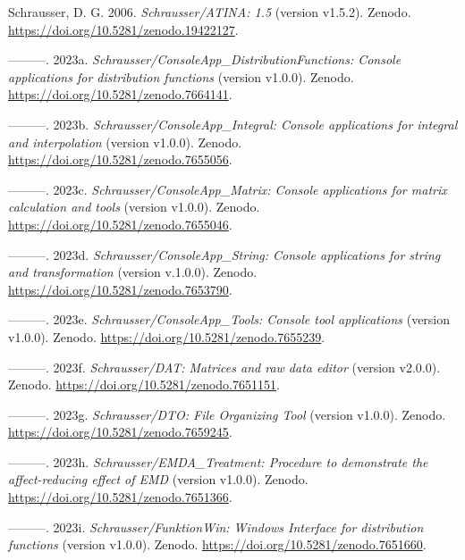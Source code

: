 \documentclass[
]{article}
\author{Dietmar Gerald SCHRAUSSER}
\date{14.04.2026}
\newlength{\cslhangindent}
\newlength{\cslentryspacingunit} %
\newenvironment{CSLReferences}[2] %
 {%
  \setlength{\parindent}{0pt}
  \ifodd #1
  \let\oldpar\par
  \def\par{\hangindent=\cslhangindent\oldpar}
  \fi
  \setlength{\parskip}{#2\cslentryspacingunit}
 }%
 {}
\begin{document}
\hypertarget{refs}{}
\begin{CSLReferences}{1}{0}
\leavevmode{}%
Schrausser, D. G. 2006. \emph{Schrausser/ATINA: 1.5} (version v1.5.2).
Zenodo. \url{https://doi.org/10.5281/zenodo.19422127}.

\leavevmode{}%
---------. 2023a. \emph{{Schrausser/ConsoleApp\_DistributionFunctions:
Console applications for distribution functions}} (version v1.0.0).
Zenodo. \url{https://doi.org/10.5281/zenodo.7664141}.

\leavevmode{}%
---------. 2023b. \emph{{Schrausser/ConsoleApp\_Integral: Console
applications for integral and interpolation}} (version v1.0.0). Zenodo.
\url{https://doi.org/10.5281/zenodo.7655056}.

\leavevmode{}%
---------. 2023c. \emph{{Schrausser/ConsoleApp\_Matrix: Console
applications for matrix calculation and tools}} (version v1.0.0).
Zenodo. \url{https://doi.org/10.5281/zenodo.7655046}.

\leavevmode{}%
---------. 2023d. \emph{{Schrausser/ConsoleApp\_String: Console
applications for string and transformation}} (version v.1.0.0). Zenodo.
\url{https://doi.org/10.5281/zenodo.7653790}.

\leavevmode{}%
---------. 2023e. \emph{{Schrausser/ConsoleApp\_Tools: Console tool
applications}} (version v1.0.0). Zenodo.
\url{https://doi.org/10.5281/zenodo.7655239}.

\leavevmode{}%
---------. 2023f. \emph{{Schrausser/DAT: Matrices and raw data editor}}
(version v2.0.0). Zenodo. \url{https://doi.org/10.5281/zenodo.7651151}.

\leavevmode{}%
---------. 2023g. \emph{{Schrausser/DTO: File Organizing Tool}} (version
v1.0.0). Zenodo. \url{https://doi.org/10.5281/zenodo.7659245}.

\leavevmode{}%
---------. 2023h. \emph{{Schrausser/EMDA\_Treatment: Procedure to
demonstrate the affect-reducing effect of EMD}} (version {v1.0.0}).
Zenodo. \url{https://doi.org/10.5281/zenodo.7651366}.

\leavevmode{}%
---------. 2023i. \emph{{Schrausser/FunktionWin: Windows Interface for
distribution functions}} (version {v1.0.0}). Zenodo.
\url{https://doi.org/10.5281/zenodo.7651660}.


\end{CSLReferences}
\end{document}
